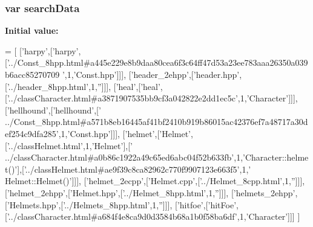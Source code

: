 \subsubsection[{search\-Data}]{\setlength{\rightskip}{0pt plus 5cm}var search\-Data}\label{all__8_8js_ad01a7523f103d6242ef9b0451861231e}
{\bfseries Initial value\-:}
\begin{DoxyCode}
=
[
  [\textcolor{stringliteral}{'harpy'},[\textcolor{stringliteral}{'harpy'},[\textcolor{stringliteral}{'../Const\_8hpp.html#a445e229e8b9daa80cea6f3c64ff47d53a23ee783aaa26350a039b6acc85270709
      '},1,\textcolor{stringliteral}{'Const.hpp'}]]],
  [\textcolor{stringliteral}{'header\_2ehpp'},[\textcolor{stringliteral}{'header.hpp'},[\textcolor{stringliteral}{'../header\_8hpp.html'},1,\textcolor{stringliteral}{''}]]],
  [\textcolor{stringliteral}{'heal'},[\textcolor{stringliteral}{'heal'},[\textcolor{stringliteral}{'../classCharacter.html#a3871907535bb9cf3a042822e2dd1ec5c'},1,\textcolor{stringliteral}{'Character'}]]],
  [\textcolor{stringliteral}{'hellhound'},[\textcolor{stringliteral}{'hellhound'},[\textcolor{stringliteral}{'
      ../Const\_8hpp.html#a571b8eb16445af41bf2410b919b86015ac42376ef7a48717a30def254c9dfa285'},1,\textcolor{stringliteral}{'Const.hpp'}]]],
  [\textcolor{stringliteral}{'helmet'},[\textcolor{stringliteral}{'Helmet'},[\textcolor{stringliteral}{'../classHelmet.html'},1,\textcolor{stringliteral}{'Helmet'}],[\textcolor{stringliteral}{'
      ../classCharacter.html#a0b86c1922a49c65ed6abc04f52b633fb'},1,\textcolor{stringliteral}{'Character::helmet()'}],[\textcolor{stringliteral}{'../classHelmet.html#ae9f39c8ca82962c770f9907123e663f5'},1,\textcolor{stringliteral}{'
      Helmet::Helmet()'}]]],
  [\textcolor{stringliteral}{'helmet\_2ecpp'},[\textcolor{stringliteral}{'Helmet.cpp'},[\textcolor{stringliteral}{'../Helmet\_8cpp.html'},1,\textcolor{stringliteral}{''}]]],
  [\textcolor{stringliteral}{'helmet\_2ehpp'},[\textcolor{stringliteral}{'Helmet.hpp'},[\textcolor{stringliteral}{'../Helmet\_8hpp.html'},1,\textcolor{stringliteral}{''}]]],
  [\textcolor{stringliteral}{'helmets\_2ehpp'},[\textcolor{stringliteral}{'Helmets.hpp'},[\textcolor{stringliteral}{'../Helmets\_8hpp.html'},1,\textcolor{stringliteral}{''}]]],
  [\textcolor{stringliteral}{'hitfoe'},[\textcolor{stringliteral}{'hitFoe'},[\textcolor{stringliteral}{'../classCharacter.html#a684f4e8ca9d0d3584b68a1b0f58ba6df'},1,\textcolor{stringliteral}{'Character'}]]]
]
\end{DoxyCode}
